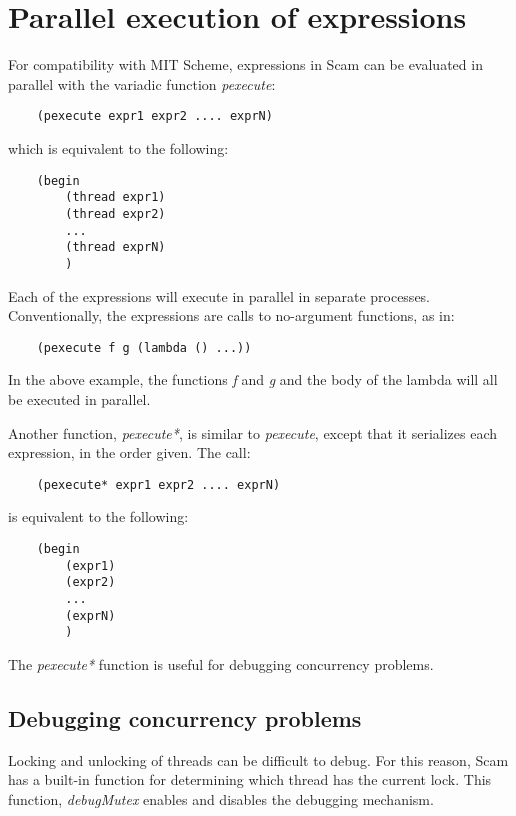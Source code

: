 \section{Parallel execution of expressions}

For compatibility with MIT Scheme, 
expressions in Scam can be evaluated in parallel with the variadic function
{\it pexecute}:

\begin{verbatim}
    (pexecute expr1 expr2 .... exprN)
\end{verbatim}

which is equivalent to the following:

\begin{verbatim}
    (begin
        (thread expr1)
        (thread expr2)
        ...
        (thread exprN)
        )
\end{verbatim}

Each of the expressions will execute in parallel in separate processes.
Conventionally, the expressions are calls to no-argument functions, as in:

\begin{verbatim}
    (pexecute f g (lambda () ...))
\end{verbatim}

In the above example, the functions {\it f} and {\it g}
and the body of the lambda
will all be executed in parallel.

Another function, {\it pexecute*}, is similar to {\it pexecute}, except
that it serializes each expression, in the order given. The call:

\begin{verbatim}
    (pexecute* expr1 expr2 .... exprN)
\end{verbatim}

is equivalent to the following:

\begin{verbatim}
    (begin
        (expr1)
        (expr2)
        ...
        (exprN)
        )
\end{verbatim}

The {\it pexecute*} function is useful for debugging concurrency problems.

\subsection{Debugging concurrency problems}

Locking and unlocking of threads can be difficult to debug.  For this reason, 
Scam has a built-in function for determining which thread has the current lock.
This function, {\it debugMutex} enables and disables the debugging mechanism.

